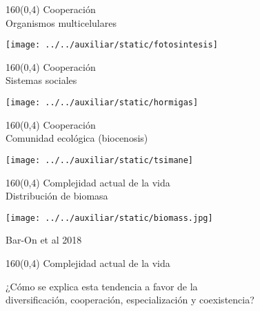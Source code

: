 \documentclass[shownotes,aspectratio=169]{beamer}
\begin{document}
\begin{frame}[plain]
\begin{textblock}{160}(0,4)
 \centering \LARGE Cooperación \\
 \Large Organismos multicelulares
\end{textblock}
\vspace{1.3cm} \centering

\texttt{[image: ../../auxiliar/static/fotosintesis]}

\end{frame}

\begin{frame}[plain]
\begin{textblock}{160}(0,4)
 \centering \LARGE Cooperación \\
 \Large Sistemas sociales
\end{textblock}
\vspace{1.3cm} \centering

\texttt{[image: ../../auxiliar/static/hormigas]}

\end{frame}

\begin{frame}[plain]
\begin{textblock}{160}(0,4)
 \centering \LARGE Cooperación \\
 \Large Comunidad ecológica (biocenosis)
\end{textblock}
\vspace{1.3cm} \centering

\texttt{[image: ../../auxiliar/static/tsimane]}

\end{frame}


\begin{frame}[plain]
\begin{textblock}{160}(0,4)
 \centering \LARGE Complejidad actual de la vida \\
 \Large Distribución de biomasa 
\end{textblock}
\vspace{2cm} \centering
\texttt{[image: ../../auxiliar/static/biomass.jpg]}

\vspace{0.3cm}

\footnotesize Bar-On et al 2018
\end{frame}

\begin{frame}[plain]
\begin{textblock}{160}(0,4)
 \centering \LARGE Complejidad actual de la vida
\end{textblock}
\vspace{1.5cm} \centering \Large 

¿Cómo se explica esta tendencia a favor de la \\ diversificación, cooperación, especialización y coexistencia?

\end{frame}
\end{document}
